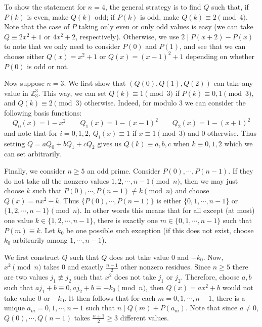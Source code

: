 \documentclass[11pt,a4paper]{article}
\begin{document}
\begin{enumerate}
    	To show the statement for $n = 4$, the general strategy is to find $Q$ such that, if $P(k)$ is even, make $Q(k)$ odd; if $P(k)$ is odd, make $Q(k)\equiv 2\pmod{4}$. 
    	Note that the case of $P$ taking only even or only odd values is easy (we can take $Q\equiv 2x^2+1$ or $4x^2+2$, respectively). 
    	Otherwise, we use $2\mid P(x+2)-P(x)$ to note that we only need to consider $P(0)$ and $P(1)$, 
    	and see that we can choose either $Q(x)=x^2+1$ or $Q(x)=(x-1)^2+1$ depending on whether $P(0)$ is odd or not. 
    	
    	Now suppose $n = 3$. 
    	We first show that $(Q(0), Q(1), Q(2))$ can take any value in $\mathbb{Z}_3^3$. 
    	This way, we can set $Q(k)\equiv 1\pmod{3}$ if $P(k)\equiv 0, 1\pmod{3}$, and $Q(k)\equiv 2\pmod{3}$ otherwise. 
    	Indeed, for modulo 3 we can consider the following basis functions: 
    	\[
    	Q_0(x) = 1 - x^2
    	\qquad 
    	Q_1(x) = 1 - (x-1)^2
    	\qquad 
    	Q_2(x) = 1 - (x+1)^2
    	\]
    	and note that for $i=0, 1, 2$, $Q_i(x)\equiv 1$ if $x\equiv 1\pmod{3}$ and 0 otherwise. 
    	Thus setting $Q = aQ_0 + bQ_1 + cQ_2$ gives us $Q(k)\equiv a, b, c$ when $k\equiv 0, 1, 2$ which we can set arbitrarily. 
    	
    	Finally, we consider $n\ge 5$ an odd prime. 
    	Consider $P(0), \cdots, P(n-1)$. 
    	If they do not take all the nonzero values $1, 2, \cdots, n-1\pmod{n}$, then we may just choose $k$ such that 
    	$P(0), \cdots, P(n-1)\not\equiv k\pmod{n}$ and choose $Q(x)=nx^2-k$. 
    	Thus $\{P(0), \cdots, P(n-1)\}$ is either 
    	$\{0, 1, \cdots, n-1\}$ or $\{1, 2, \cdots, n-1\}\pmod{n}$. 
    	In other words this means that for all except (at most) one value $k\in \{1, 2, \cdots, n-1\}$, 
    	there is exactly one $m\in\{0, 1, \cdots, n-1\}$ such that $P(m)\equiv k$. 
    	Let $k_0$ be one possible such exception (if this does not exist, choose $k_0$ arbitrarily among $1, \cdots, n-1$). 
    	
    	We first construct $Q$ such that $Q$ does not take value 0 and $-k_0$. 
    	Now, $x^2\pmod{n}$ takes 0 and exactly $\frac{n-1}{2}$ other nonzero residues. 
    	Since $n\ge 5$ there are two values 
    	$j_1\not\equiv j_2$ such that $x^2$ does not take $j_1$ or $j_2$. 
    	Therefore, choose $a, b$ such that 
    	$aj_1+b\equiv 0, aj_2+b\equiv -k_0\pmod{n}$, 
    	then $Q(x)=ax^2+b$ would not take value $0$ or $-k_0$. 
    	It then follows that for each $m = 0, 1, \cdots, n - 1$, 
    	there is a unique $a_m=0, 1, \cdots, n - 1$ such that 
    	$n\mid Q(m)+P(a_m)$. 
    	Note that since $a\neq 0$, 
    	$Q(0), \cdots, Q(n-1)$ takes $\frac{n+1}{2} \ge 3$ different values. 
    	

\end{enumerate}
\end{document}
